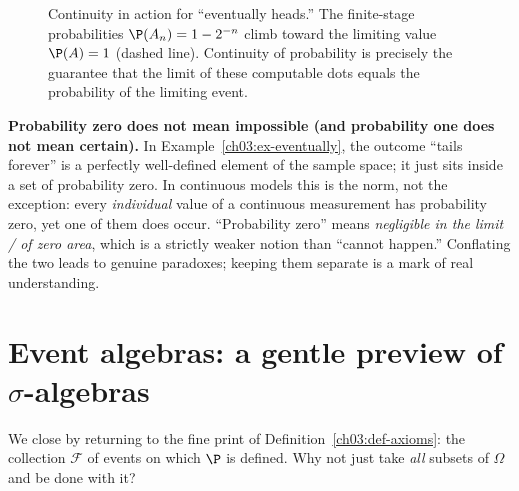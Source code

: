 \begin{figure}[H]
\centering
{}
\caption{Continuity in action for ``eventually heads.'' The finite-stage
probabilities $\P(A_n)=1-2^{-n}$ climb toward the limiting value $\P(A)=1$
(dashed line). Continuity of probability is precisely the guarantee that the
limit of these computable dots equals the probability of the limiting event.}
\label{ch03:fig-continuity}
\end{figure}

\begin{trapbox}
\textbf{Probability zero does not mean impossible (and probability one does not
mean certain).} In Example~\ref{ch03:ex-eventually}, the outcome ``tails forever''
is a perfectly well-defined element of the sample space; it just sits inside a set
of probability zero. In continuous models this is the norm, not the exception:
every \emph{individual} value of a continuous measurement has probability zero,
yet one of them does occur. ``Probability zero'' means \emph{negligible in the
limit / of zero area}, which is a strictly weaker notion than ``cannot happen.''
Conflating the two leads to genuine paradoxes; keeping them separate is a mark of
real understanding.
\end{trapbox}

\section{Event algebras: a gentle preview of $\sigma$-algebras}
\label{ch03:algebra}

We close by returning to the fine print of Definition~\ref{ch03:def-axioms}: the
collection $\mathcal{F}$ of events on which $\P$ is defined. Why not just take
\emph{all} subsets of $\Omega$ and be done with it?

